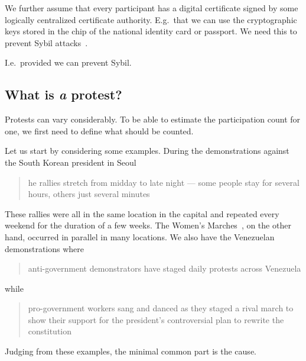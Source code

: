We further assume that every participant has a digital certificate signed by 
some logically centralized certificate authority.
E.g.\ that we can use the cryptographic keys stored in the chip of the national 
identity card or passport.
We need this to prevent Sybil attacks~\cite{SybilAttack}.
\begin{frame}
\begin{remark}
  I.e.\ provided we can prevent Sybil.
\end{remark}
\end{frame}

\subsection{What is \protect\emph{a} protest?}%
\label{WhatIsAProtest}

Protests can vary considerably.
To be able to estimate the participation count for one, we first need to define
what should be counted.

Let us start by considering some examples.
During the demonstrations against the South Korean president in Seoul
\blockcquote{2016DemonstrationsInSeoul}{%
  he rallies stretch from midday to late night --- some 
  people stay for several hours, others just several minutes%
}.
These rallies were all in the same location in the capital and repeated every 
weekend for the duration of a few weeks.
The Women's Marches~\cite{2017WomensMarchesInUS}, on the other hand, occurred 
in parallel in many locations.
We also have the Venezuelan demonstrations where
\blockcquote{2017VenezuelaProtestFrequency}{%
  anti-government demonstrators have staged daily protests across Venezuela%
} while
\blockcquote{AlJazeeraOnVenezuela2017}{%
  pro-government workers sang and danced as they staged a rival march to show 
  their support for the president's controversial plan to rewrite the 
  constitution%
}.
Judging from these examples, the minimal common part is the cause.


